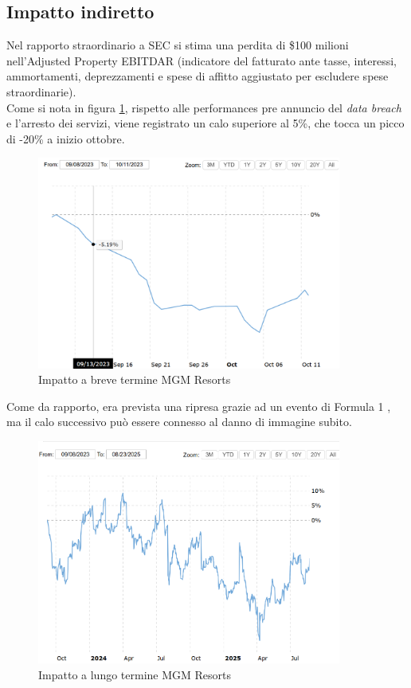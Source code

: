 \documentclass[12pt,a4paper,openright,twoside]{report}
\begin{document}
\subsection{Impatto indiretto}
Nel rapporto straordinario a SEC si stima una perdita di  \$100 milioni nell'Adjusted Property EBITDAR (indicatore del fatturato ante tasse, interessi,  ammortamenti, deprezzamenti e spese di affitto aggiustato per escludere spese straordinarie).\\
Come si nota in figura \ref{fig:mgm1}, rispetto alle performances pre annuncio del \textit{data breach} e l'arresto dei servizi, viene registrato un calo superiore al 5\%, che tocca un picco di -20\% a inizio ottobre.\\
\begin{figure}[H] 
\begin{center} 
\includegraphics[width=10cm]{figures/MGM_short.png} 
\caption[Grafico MGM Resorts short]{Impatto a breve termine MGM Resorts}\label{fig:mgm1}
\end{center}
\end{figure}

Come da rapporto, era prevista una ripresa grazie ad un evento di Formula 1 \cite{MGM_8k_2023}, ma il calo successivo pu\`o essere connesso al danno di immagine subito.\\

\begin{figure}[H] 
\begin{center} 
\includegraphics[width=10cm]{figures/MGM_long.png} 
\caption[Grafico MGM Resorts long]{Impatto a lungo termine  MGM Resorts}\label{fig:mgm2}
\end{center}
\end{figure}
\end{document}

